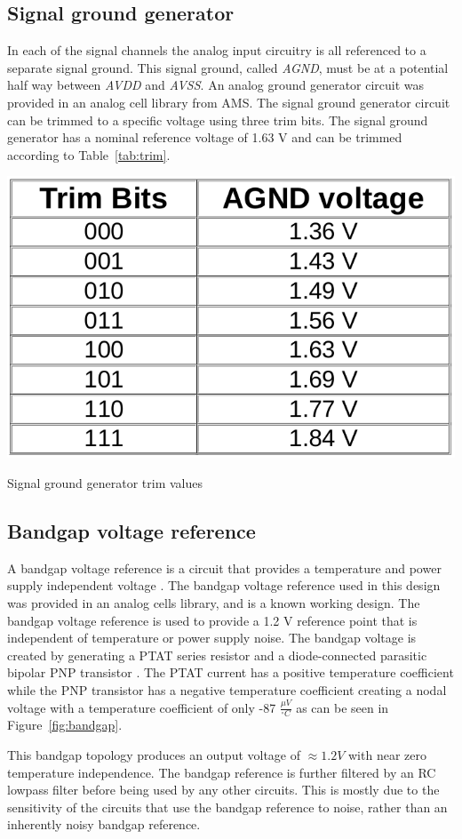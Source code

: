 \documentclass[12pt,oneside,final]{siuethesis}
\theoremstyle{definition}
\begin{document}
\subsection{Signal ground generator}
\par In each of the signal channels the analog input circuitry is all referenced to a separate signal ground. This signal ground, called \emph{AGND}, must be at a potential half way between \emph{AVDD} and \emph{AVSS}. An analog ground generator circuit was provided in an analog cell library from AMS. The signal ground generator circuit can be trimmed to a specific voltage using three trim bits. The signal ground generator has a nominal reference voltage of 1.63 V and can be trimmed according to Table~\ref{tab:trim}.


\begin{table}[htbp!]
 \centering
 \includegraphics[scale=.30,keepaspectratio=true]{./ch3_figures/trim.png}
 \caption{Signal ground generator trim values}
 \label{tab:trim}
\end{table}

\subsection{Bandgap voltage reference}
\par A bandgap voltage reference is a circuit that provides a temperature and power supply independent voltage \cite{ALLEN}. The bandgap voltage reference used in this design was provided in an analog cells library, and is a known working design. The bandgap voltage reference is used to provide a 1.2 V reference point that is independent of temperature or power supply noise. The bandgap voltage is created by generating a PTAT series resistor and a diode-connected parasitic bipolar PNP transistor \cite{ALLEN}. The PTAT current has a positive temperature coefficient while the PNP transistor has a negative temperature coefficient creating a nodal voltage with a temperature coefficient of only -87 $\frac{\mu V}{^{\circ}C}$ as can be seen in Figure~\ref{fig:bandgap}.
\par This bandgap topology produces an output voltage of $\approx 1.2 V$ with near zero temperature independence. The bandgap reference is further filtered by an RC lowpass filter before being used by any other circuits. This is mostly due to the sensitivity of the circuits that use the bandgap reference to noise, rather than an inherently noisy bandgap reference.
\end{document}
